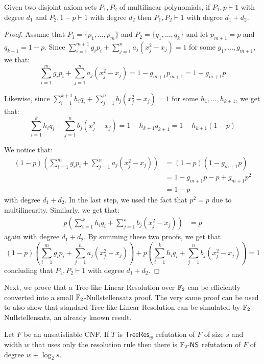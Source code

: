 \begin{lemma}
    \label{union_ref}
 Given two disjoint axiom sets $P_1, P_2$ of multilinear polynomials, if $P_1, p \vdash 1$ with degree $d_1$ and $P_2, 1-p \vdash 1$ with degree $d_2$ then $P_1, P_2 \vdash 1$ with degree $d_1 + d_2$.
\end{lemma}

\begin{proof}
 Assume that $P_1 = \{p_1, \ldots, p_m\}$ and $P_2 = \{q_1, \ldots, q_k\}$ and let $p_{m+1} = p$ and $q_{k+1} = 1-p$. Since $\sum_{i = 1}^{m+1} g_i p_i + \sum_{j = 1}^n a_j (x_j^2-x_j) = 1$ for some $g_1, \ldots, g_{m+1}$, we that:
\[\sum_{i = 1}^{m} g_i p_i + \sum_{j = 1}^n a_j (x_j^2-x_j) = 1 - g_{m+1} p_{m+1} = 1-g_{m+1} p\]
    
\noindent
 Likewise, since $\sum_{i = 1}^{k+1} h_i q_i + \sum_{j = 1}^n b_j (x_j^2-x_j) = 1$ for some $h_1, \ldots, h_{k+1}$, we get that:
\[\sum_{i = 1}^{k} h_iq_i + \sum_{j = 1}^n b_j (x_j^2-x_j) = 1-h_{k+1}q_{k+1} = 1-h_{k+1}(1-p)\]

\noindent
 We notice that:
    \[\begin{split}
 (1-p) \left (\sum_{i = 1}^{m} g_i p_i + \sum_{j = 1}^n a_j (x_j^2-x_j) \right ) &= (1-p)(1-g_{m+1} p) \\
        &= 1-g_{m+1}p- p+ g_{m+1}p^2 \\
        &= 1-p
    \end{split}\]
 with degree $d_1+d_2$. In the last step, we used the fact that $p^2 = p$ due to multilinearity. Similarly, we get that:
    \[\begin{split}
 p\left (\sum_{i = 1}^{k} h_iq_i + \sum_{j = 1}^n b_j (x_j^2-x_j)  \right ) &= p 
    \end{split}\]
 again with degree $d_1+d_2$. By summing these two proofs, we get that 
    \[(1-p) \left (\sum_{i = 1}^{m} g_i p_i + \sum_{j = 1}^n a_j (x_j^2-x_j) \right ) + p \left (\sum_{i = 1}^{k} h_iq_i + \sum_{j = 1}^n b_j (x_j^2-x_j) \right )= 1\]
 concluding that $P_1, P_2 \vdash 1$ with degree $d_1 + d_2$.
\end{proof}

Next, we prove that a Tree-like Linear Resolution over $\mathbb{F}_2$ can be efficiently converted into a small $\mathbb{F}_2$-Nullstellensatz proof. The very same proof can be used to also show that standard Tree-like Linear Resolution can be simulated by $\mathbb{F}_2$-Nullstellensatz, an already known result.

\begin{lemma}
    \label{treeref_no_weak}
    Let $F$ be an unsatisfiable CNF. If $T$ is $\mathsf{TreeRes}_\oplus$ refutation of $F$ of size $s$ and width $w$ that uses only the resolution rule then there is $\mathbb{F}_2\text{-}\mathsf{NS}$ refutation of $F$ of degree $w+\log_2 s$.
\end{lemma}

